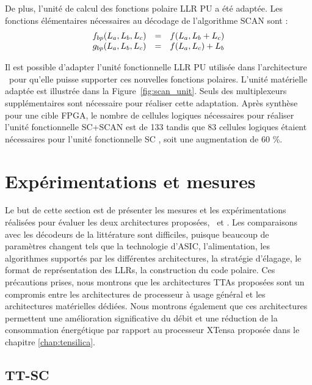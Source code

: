 De plus, l'unité de calcul des fonctions polaire LLR PU a été adaptée. Les fonctions élémentaires nécessaires au décodage de l'algorithme SCAN sont : 
\begin{eqnarray}
  \begin{array}{l c l}
    f_{bp}(L_a,L_b,L_c) & = & f(L_a, L_b  + L_c) \\
    g_{bp}(L_a,L_b,L_c) & = & f(L_a, L_c) + L_b
  \end{array}
  \label{eq:bp}
\end{eqnarray}


Il est possible d'adapter l'unité fonctionnelle LLR PU utilisée dans l'architecture \TTSC~pour qu'elle puisse supporter ces nouvelles fonctions polaires. L'unité matérielle adaptée est illustrée dans la Figure~\ref{fig:scan_unit}. Seuls des multiplexeurs supplémentaires sont nécessaire pour réaliser cette adaptation. Après synthèse pour une cible FPGA, le nombre de cellules logiques nécessaires pour réaliser l'unité fonctionnelle \og SC+SCAN \fg est de 133 tandis que 83 cellules logiques étaient nécessaires pour l'unité fonctionnelle \og SC \fg, soit une augmentation de 60 \%.



\section{Expérimentations et mesures}
Le but de cette section est de présenter les mesures et les expérimentations réalisées pour évaluer les deux architectures proposées, \TTSC~et \TTSCAN. Les comparaisons avec les décodeurs de la littérature sont difficiles, puisque beaucoup de paramètres changent tels que la technologie d'ASIC, l'alimentation, les algorithmes supportés par les différentes architectures, la stratégie d'élagage, le format de représentation des LLRs, la construction du code polaire. Ces précautions prises, nous montrons que les architectures TTAs proposées sont un compromis entre les architectures de processeur à usage général et les architectures matérielles dédiées. Nous montrons également que ces architectures permettent une amélioration significative du débit et une réduction de la consommation énergétique par rapport au processeur XTensa proposée dans le chapitre \ref{chap:tensilica}.

\subsection{TT-SC}


